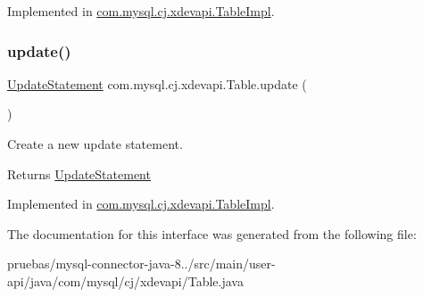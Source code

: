 Implemented in \mbox{\hyperlink{classcom_1_1mysql_1_1cj_1_1xdevapi_1_1_table_impl_a048429d90cca804cd60ce9a49f5b12fd}{com.\+mysql.\+cj.\+xdevapi.\+Table\+Impl}}.

\mbox{\label{interfacecom_1_1mysql_1_1cj_1_1xdevapi_1_1_table_a941215cefeb7236388db7d0390621a17}} 
\subsubsection{\texorpdfstring{update()}{update()}}
{\footnotesize\ttfamily \mbox{\hyperlink{interfacecom_1_1mysql_1_1cj_1_1xdevapi_1_1_update_statement}{Update\+Statement}} com.\+mysql.\+cj.\+xdevapi.\+Table.\+update (\begin{DoxyParamCaption}{ }\end{DoxyParamCaption})}

Create a new update statement.

\begin{DoxyReturn}{Returns}
\mbox{\hyperlink{interfacecom_1_1mysql_1_1cj_1_1xdevapi_1_1_update_statement}{Update\+Statement}} 
\end{DoxyReturn}


Implemented in \mbox{\hyperlink{classcom_1_1mysql_1_1cj_1_1xdevapi_1_1_table_impl_a4f6da4761f5ff7becb0737c11b0ea0db}{com.\+mysql.\+cj.\+xdevapi.\+Table\+Impl}}.



The documentation for this interface was generated from the following file\+:\begin{DoxyCompactItemize}
\item 
pruebas/mysql-\/connector-\/java-\/8../src/main/user-\/api/java/com/mysql/cj/xdevapi/Table.\+java\end{DoxyCompactItemize}
